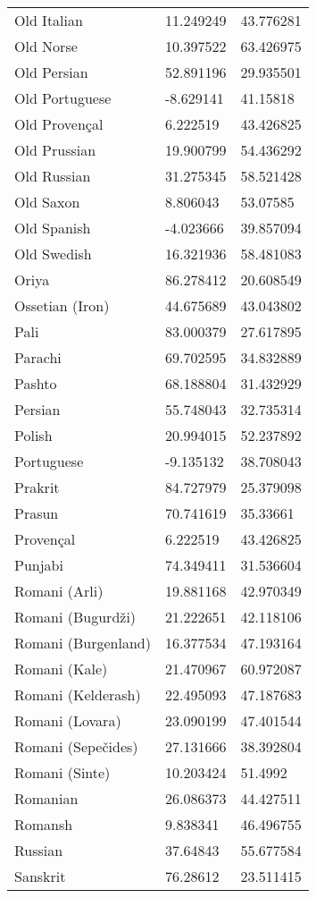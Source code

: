 \begin{longtable}{lll}
Old Italian & 11.249249 & 43.776281\\
Old Norse & 10.397522 & 63.426975\\
Old Persian & 52.891196 & 29.935501\\
Old Portuguese & -8.629141 & 41.15818\\
Old Proven\c{c}al & 6.222519 & 43.426825\\
Old Prussian & 19.900799 & 54.436292\\
Old Russian & 31.275345 & 58.521428\\
Old Saxon & 8.806043 & 53.07585\\
Old Spanish & -4.023666 & 39.857094\\
Old Swedish & 16.321936 & 58.481083\\
Oriya & 86.278412 & 20.608549\\
Ossetian (Iron) & 44.675689 & 43.043802\\
Pali & 83.000379 & 27.617895\\
Parachi & 69.702595 & 34.832889\\
Pashto & 68.188804 & 31.432929\\
Persian & 55.748043 & 32.735314\\
Polish & 20.994015 & 52.237892\\
Portuguese & -9.135132 & 38.708043\\
Prakrit & 84.727979 & 25.379098\\
Prasun & 70.741619 & 35.33661\\
Proven\c{c}al & 6.222519 & 43.426825\\
Punjabi & 74.349411 & 31.536604\\
Romani (Arli) & 19.881168 & 42.970349\\
Romani (Bugurd\v{z}i) & 21.222651 & 42.118106\\
Romani (Burgenland) & 16.377534 & 47.193164\\
Romani (Kale) & 21.470967 & 60.972087\\
Romani (Kelderash) & 22.495093 & 47.187683\\
Romani (Lovara) & 23.090199 & 47.401544\\
Romani (Sepe\v{c}ides) & 27.131666 & 38.392804\\
Romani (Sinte) & 10.203424 & 51.4992\\
Romanian & 26.086373 & 44.427511\\
Romansh & 9.838341 & 46.496755\\
Russian & 37.64843 & 55.677584\\
Sanskrit & 76.28612 & 23.511415\\

\end{longtable}
